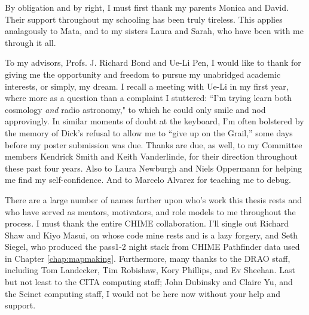 \begin{acknowledgements}

By obligation and by right, I must first thank my parents Monica and David. Their support throughout my schooling has been truly tireless. This applies analagously to Mata, and to my sisters Laura and Sarah, who have been with me through it all.

To my advisors, Profs. J. Richard Bond and Ue-Li Pen, I would like to thank for giving me the opportunity and freedom to pursue my unabridged academic interests, or simply, my dream. I recall a meeting with Ue-Li in my first year, where more as a question than a complaint I stuttered: ``I'm trying learn both cosmology \textit{and} radio astronomy," to which he could only smile and nod approvingly. In similar moments of doubt at the keyboard, I'm often bolstered by the memory of Dick's refusal to allow me to ``give up on the Grail,'' some days before my poster submission was due. Thanks are due, as well, to my Committee members Kendrick Smith and Keith Vanderlinde, for their direction throughout these past four years. Also to Laura Newburgh and Niels Oppermann for helping me find my self-confidence. And to Marcelo Alvarez for teaching me to debug.

There are a large number of names further upon who's work this thesis rests and who have served as mentors, motivators, and role models to me throughout the process. I must thank the entire CHIME collaboration. I'll single out Richard Shaw and Kiyo Masui, on whose code mine rests and is a lazy forgery, and Seth Siegel, who produced the pass1-2 night stack from CHIME Pathfinder data used in Chapter \ref{chap:mapmaking}. Furthermore, many thanks to the DRAO staff, including Tom Landecker, Tim Robishaw, Kory Phillips, and Ev Sheehan. Last but not least to the CITA computing staff; John Dubinsky and Claire Yu, and the Scinet computing staff, I would not be here now without your help and support.

\end{acknowledgements}